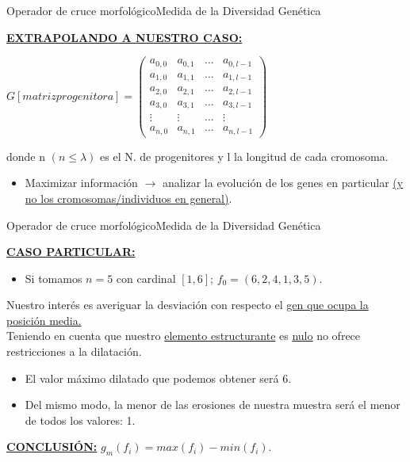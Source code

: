 \documentclass[10pt]{beamer}
\begin{document}
			
			
			\begin{frame}{Operador de cruce morfol\'ogico}{Medida de la Diversidad Gen\'etica}
				\begin{center}
					\underline{\textbf{EXTRAPOLANDO A NUESTRO CASO:}}
					
					$ G[matriz progenitora] = \left(\begin{array}{cccc}
					a_{0,0}   & a_{0,1} & \ldots &a_{0,l-1} \\
					a_{1,0}   & a_{1,1} & \ldots &a_{1,l-1} \\
					a_{2,0}   & a_{2,1} & \ldots &a_{2,l-1} \\
					a_{3,0}   & a_{3,1} & \ldots &a_{3,l-1} \\
					\vdots  & \vdots & \ldots &\vdots \\
					a_{n,0}   & a_{n,1} & \ldots &a_{n,l-1} 
					\end{array} \right)$ \par
					donde n $(n \leqslant \lambda)$ es el N. de progenitores y l la longitud de cada cromosoma.
					
					\begin{itemize}
						\item Maximizar informaci\'on $\rightarrow$ analizar la evoluci\'on de los genes en particular \underline{(y no los cromosomas/individuos en general)}.
					\end{itemize}
				\end{center}
			\end{frame}
			
			
			
			\begin{frame}{Operador de cruce morfol\'ogico}{Medida de la Diversidad Gen\'etica}
				
				\underline{\textbf{CASO PARTICULAR:}}
				\begin{itemize}
					\item Si tomamos $n = 5$ con cardinal $\left[1,6\right]$; $f_{0} = (6, 2, 4, 1, 3, 5)$.
				\end{itemize}
				Nuestro inter\'es es averiguar la desviaci\'on con respecto el \underline{gen que ocupa la posici\'on media.}\\
				Teniendo en cuenta que nuestro \underline{elemento estructurante} es \underline{nulo} no ofrece restricciones a la dilataci\'on.
				\begin{itemize}
					\item El valor m\'aximo dilatado que podemos obtener ser\'a 6.
					\item Del mismo modo, la menor de las erosiones de nuestra muestra ser\'a el menor de todos los valores: 1.
				\end{itemize}
				
				\begin{center}
					\underline{\textbf{CONCLUSI\'ON:}} $g_{m}(f_{i}) = max(f_{i})- min(f_{i})$.
				\end{center}
				
			\end{frame}
			
\end{document}
